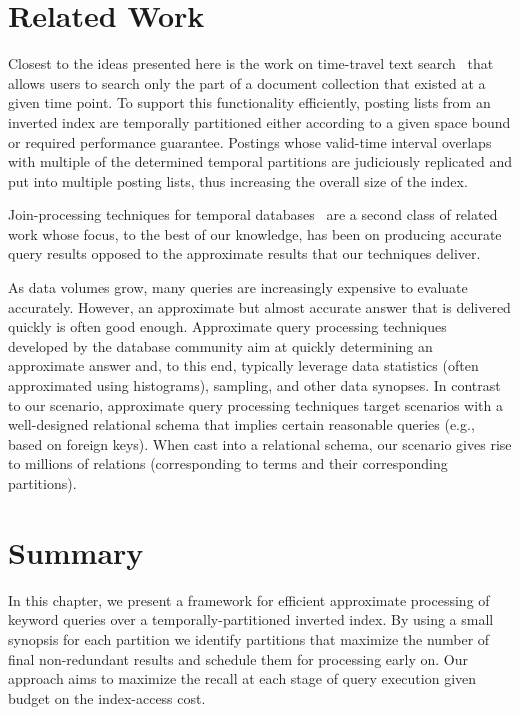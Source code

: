 \section{Related Work}
\label{chap:selection:relwork}

Closest to the ideas presented here is the work on
time-travel text search~\cite{kberberi:sigir2007} that allows users to
search only the part of a document collection that existed at a given
time point. To support this functionality efficiently, posting lists
from an inverted index are temporally partitioned either according to
a given space bound or required performance guarantee. Postings whose
valid-time interval overlaps with multiple of the determined temporal
partitions are judiciously replicated and put into multiple posting
lists, thus increasing the overall size of the index.

Join-processing techniques for temporal databases~\cite{Gao2005} are a
second class of related work whose focus, to the best of our
knowledge, has been on producing accurate query results opposed to the
approximate results that our techniques deliver.

As data volumes grow, many queries are increasingly expensive to
evaluate accurately. However, an approximate but almost accurate
answer that is delivered quickly is often good enough. Approximate
query processing techniques~\cite{Acharya1999,Acharya1999a} developed
by the database community aim at quickly determining an approximate
answer and, to this end, typically leverage data statistics (often
approximated using histograms), sampling, and other data synopses. In
contrast to our scenario, approximate query processing techniques
target scenarios with a well-designed relational schema that implies
certain reasonable queries (e.g., based on foreign keys). When cast
into a relational schema, our scenario gives rise to millions of
relations (corresponding to terms and their corresponding
partitions).


\section{Summary}
\label{chap:selection:sec:summary}
In this chapter, we present a framework for efficient approximate processing of keyword queries over a temporally-partitioned inverted index. By using a small synopsis for each partition we identify partitions that maximize the number of final non-redundant results and schedule them for processing early on. Our approach aims to maximize  the recall at each stage of query execution given budget on the index-access cost.

